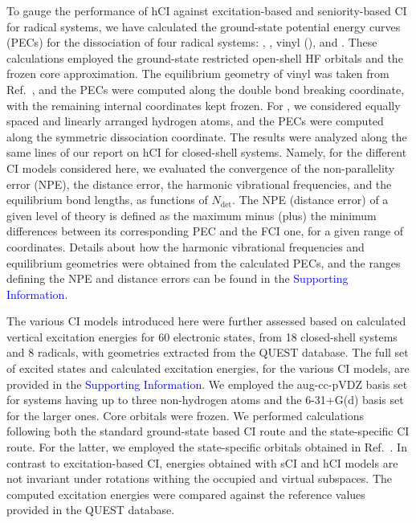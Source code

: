 \documentclass[aip,jcp,reprint,noshowkeys,superscriptaddress]{revtex4-1}
\newcommand{\SupInf}{\textcolor{blue}{Supporting Information}}
\newcommand{\Ndet}{N_\text{det}}
\begin{document}
To gauge the performance of hCI against excitation-based and seniority-based CI for radical systems,
we have calculated the ground-state potential energy curves (PECs) for the dissociation of four radical systems:
, , vinyl (), and .
These calculations employed the ground-state restricted open-shell HF orbitals and the frozen core approximation.
The equilibrium geometry of vinyl was taken from Ref.~,
and the PECs were computed along the  double bond breaking coordinate, with the remaining internal coordinates kept frozen.
For , we considered equally spaced and linearly arranged hydrogen atoms, and the PECs were computed along the symmetric dissociation coordinate.
The results were analyzed along the same lines of our report on hCI for closed-shell systems. \cite{Kossoski_2022}
Namely, for the different CI models considered here, 
we evaluated the convergence of the non-parallelity error (NPE), the distance error, the harmonic vibrational frequencies, and the equilibrium bond lengths, as functions of $\Ndet$.
The NPE (distance error) of a given level of theory is defined as the maximum minus (plus) the minimum differences between its corresponding PEC and the FCI one, for a given range of coordinates.
Details about how the harmonic vibrational frequencies and equilibrium geometries were obtained from the calculated PECs,
and the ranges defining the NPE and distance errors can be found in the \SupInf.

The various CI models introduced here were further assessed based on calculated vertical excitation energies for 60 electronic states,
from 18 closed-shell systems and 8 radicals, with geometries extracted from the QUEST database. \cite{Veril_2021}
The full set of excited states and calculated excitation energies, for the various CI models, are provided in the {\SupInf}.
We employed the aug-cc-pVDZ basis set for systems having up to three non-hydrogen atoms and the 6-31+G(d) basis set for the larger ones.
Core orbitals were frozen.
We performed calculations following both the standard ground-state based CI route and the state-specific CI route. \cite{Kossoski_2023}
For the latter, we employed the state-specific orbitals obtained in Ref.~.
In contrast to excitation-based CI, energies obtained with sCI and hCI models are not invariant under rotations withing the occupied and virtual subspaces.
The computed excitation energies were compared against the reference values provided in the QUEST database. \cite{Veril_2021}
\end{document}
